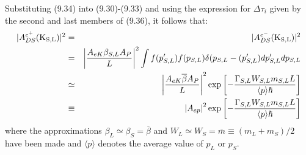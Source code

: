 \documentclass [12pt]{article}
\begin{document}
{   \par Substituting (9.34) into (9.30)-(9.33) and using the expression for $\Delta \tau_i$ given 
 by the second and last members of (9.36), it follows that: 
     \begin{eqnarray}
    |A_{DS}^{e^+}({\rm K_{S,L}})|^2 &  = & |A_{DS}^{e^-}({\rm K_{S,L}})|^2 \nonumber \\
   &  = &  \left|\frac{A_{eK} \beta_{S,L} A_P }{L}\right|^2
     \int f(p'_{S,L})  f(p_{S,L}) \delta(p_{S,L}- (p'_{S,L}) dp'_{S,L} dp_{S,L} \nonumber \\
     & \simeq &  \left|\frac{A_{eK}\overline{\beta} A_P }{L}\right|^2
    \exp \left[-\frac{\Gamma_{S,L} W_{S,L}m_{S,L} L}{\langle p \rangle \hbar}\right] \nonumber \\
     & \equiv &  \left| A_{ep}\right|^2 
 \exp \left[-\frac{\Gamma_{S,L} W_{S,L}m_{S,L} L}{\langle p \rangle \hbar}\right]
    \end{eqnarray}
    where the approximations $\beta_L \simeq \beta_S = \overline{\beta}$ and 
    $W_L \simeq W_S = \overline{m} \equiv (m_L+m_S)/2$ have been made and $\langle p \rangle$ denotes 
   the average value of $p_L$ or $p_S$. 
 
}
\end{document}
